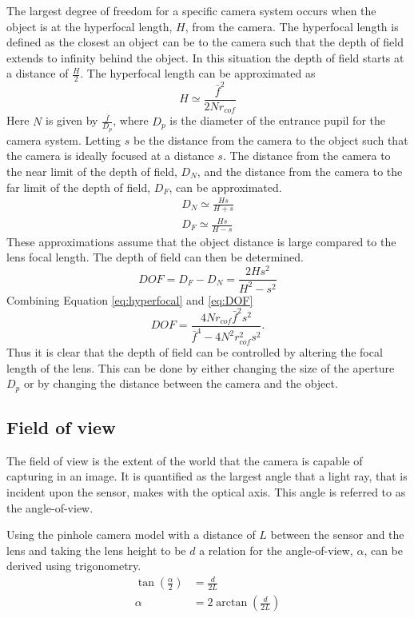 \documentclass[12pt,oneside,openany,a4paper, %
english, %
masters-t, goldenblock]{usthesis}
\newcommand*\mean[1]{\bar{#1}} %
\begin{document}
The largest degree of freedom for a specific camera system occurs when the object is at the hyperfocal length, $H$, from the camera. The hyperfocal length is defined as the closest an object can be to the camera such that the depth of field extends to infinity behind the object. In this situation the depth of field starts at a distance of $\frac{H}{2}$. The hyperfocal length can be approximated as
\begin{equation}
  H \simeq \frac{\mean{f}^2}{2 N r_{cof}}
  \label{eq:hyperfocal}
\end{equation}
Here $N$ is given by $\frac{\mean{f}}{D_p}$, where $D_p$ is the diameter of the entrance pupil for the camera system. Letting $s$ be the distance from the camera to the object such that the camera is ideally focused at a distance $s$. The distance from the camera to the near limit of the depth of field, $D_N$, and the distance from the camera to the far limit of the depth of field, $D_F$, can be approximated.
\begin{align}
  D_N \simeq \frac{Hs}{H+s} \\
  D_F \simeq \frac{Hs}{H-s}
\end{align}
These approximations assume that the object distance is large compared to the lens focal length. The depth of field can then be determined.
\begin{equation}
  DOF = D_F - D_N = \frac{2 H s^2}{H^2 - s^2}
  \label{eq:DOF}
\end{equation}
Combining Equation \ref{eq:hyperfocal} and \ref{eq:DOF} 
\begin{equation}
  DOF = \frac{4 N r_{cof} \mean{f}^2 s^2}{\mean{f}^4 - 4 N^2 r_{cof}^2 s^2}.
\end{equation}
Thus it is clear that the depth of field can be controlled by altering the focal length of the lens. This can be done by either changing the size of the aperture $D_p$ or by changing the distance between the camera and the object.

\subsection{Field of view}
The field of view is the extent of the world that the camera is capable of capturing in an image. It is quantified as the largest angle that a light ray, that is incident upon the sensor, makes with the optical axis. This angle is referred to as the angle-of-view.

Using the pinhole camera model with a distance of $L$  between the sensor and the lens and taking the lens height to be $d$ a relation for the angle-of-view, $\alpha$, can be derived using trigonometry.
\begin{align}
  \tan \left( \frac{\alpha}{2} \right) &= \frac{d}{2 L} \\
  \alpha &= 2 \arctan \left( \frac{d}{2L} \right)
\end{align}
\end{document}
